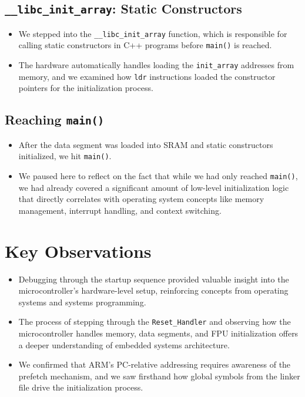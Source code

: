 \documentclass{article}
\begin{document}
\subsection{\texttt{\_\_libc\_init\_array}: Static Constructors}
\begin{itemize}
    \item We stepped into the \texttt{\_\_libc\_init\_array} function, which is responsible for calling static constructors in C++ programs before \texttt{main()} is reached.
    \item The hardware automatically handles loading the \texttt{init\_array} addresses from memory, and we examined how \texttt{ldr} instructions loaded the constructor pointers for the initialization process.
\end{itemize}

\subsection{Reaching \texttt{main()}}
\begin{itemize}
    \item After the data segment was loaded into SRAM and static constructors initialized, we hit \texttt{main()}.
    \item We paused here to reflect on the fact that while we had only reached \texttt{main()}, we had already covered a significant amount of low-level initialization logic that directly correlates with operating system concepts like memory management, interrupt handling, and context switching.
\end{itemize}

\section{Key Observations}
\begin{itemize}
    \item Debugging through the startup sequence provided valuable insight into the microcontroller’s hardware-level setup, reinforcing concepts from operating systems and systems programming.
    \item The process of stepping through the \texttt{Reset\_Handler} and observing how the microcontroller handles memory, data segments, and FPU initialization offers a deeper understanding of embedded systems architecture.
    \item We confirmed that ARM’s PC-relative addressing requires awareness of the prefetch mechanism, and we saw firsthand how global symbols from the linker file drive the initialization process.
\end{itemize}
\end{document}
